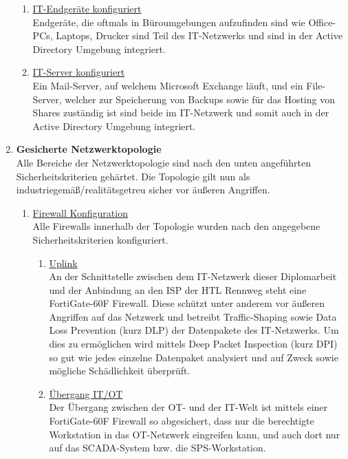 \documentclass[
	headings=optiontotocandhead,%
	oneside,
	numbers=noenddot,%
	toc=flat, %
	10pt, %
	parskip=full, %
	listof=totoc, %
	listof=flat, %
	numbers=noenddot, %
	bibliography=totoc, %
	a4paper,DIV=14,
]{scrartcl}
\begin{document}
\begin{enumerate}[start=1,label={\bfseries Ziel-H \arabic*},leftmargin=*,wide]
\begin{enumerate}[label=\alph*.]
\item{\underline{IT-Endgeräte konfiguriert}}\\
Endgeräte, die oftmals in Büroumgebungen aufzufinden sind wie Office-PCs, Laptops, Drucker sind Teil des IT-Netzwerks und sind in der Active Directory Umgebung integriert.

\item{\underline{IT-Server konfiguriert}}\\
Ein Mail-Server, auf welchem Microsoft Exchange läuft, und ein File-Server, welcher zur Speicherung von Backups sowie für das Hosting von Shares zuständig ist sind beide im IT-Netzwerk und somit auch in der Active Directory Umgebung integriert.

\end{enumerate}
\item{\bfseries{Gesicherte Netzwerktopologie}}\\
Alle Bereiche der Netzwerktopologie sind nach den unten angeführten Sicherheitskriterien gehärtet. Die Topologie gilt nun als industriegemäß/realitätsgetreu sicher vor äußeren Angriffen.

\begin{enumerate}[label=\alph*.]
\item{\underline{Firewall Konfiguration}}\\
Alle Firewalls innerhalb der Topologie wurden nach den angegebene Sicherheitskriterien konfiguriert. 

\begin{enumerate}[label=\roman*.]
\item{\underline{Uplink}}\\
An der Schnittstelle zwischen dem IT-Netzwerk dieser Diplomarbeit und der Anbindung an den ISP der HTL Rennweg steht eine FortiGate-60F Firewall. Diese schützt unter anderem vor äußeren Angriffen auf das Netzwerk und betreibt Traffic-Shaping sowie Data Loss Prevention (kurz DLP) der Datenpakete des IT-Netzwerks. Um dies zu ermöglichen wird mittels Deep Packet Inspection (kurz DPI) so gut wie jedes einzelne Datenpaket analysiert und auf Zweck sowie mögliche Schädlichkeit überprüft.

\item{\underline{Übergang IT/OT}}\\
Der Übergang zwischen der OT- und der IT-Welt ist mittels einer FortiGate-60F Firewall so abgesichert, dass nur die berechtigte Workstation in das OT-Netzwerk eingreifen kann, und auch dort nur auf das SCADA-System bzw. die SPS-Workstation.


\end{enumerate}
\end{enumerate}
\end{enumerate}
\end{document}

